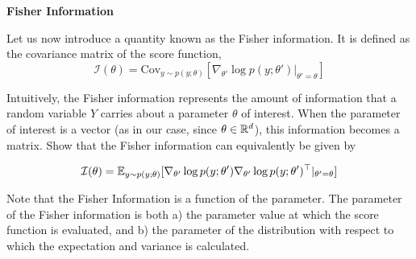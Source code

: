 \item {} \textbf{Fisher Information}

Let us now introduce a quantity known as the Fisher information. It is defined as the covariance matrix of the score function,
$$\mathcal{I}(\theta) = \text{Cov}_{y \sim p(y;\theta)}[\nabla_{\theta'}\log p(y;\theta')|_{\theta'=\theta}]$$

Intuitively, the Fisher information represents the amount of information that a random variable $Y$ carries about a parameter $\theta$ of interest. When the parameter of interest is a vector (as in our case, since $\theta \in \mathbb{R}^{{d}}$), this information becomes a matrix. Show that the Fisher information can equivalently be given by

$$\mathcal{I}(\theta)=\mathbb{E}_{y\sim p(y;\theta)}[\nabla_{\theta'} \log p(y;\theta')\nabla_{\theta'} \log p(y;\theta')^\top|_{\theta'=\theta}]$$

Note that the Fisher Information is a function of the parameter. The parameter of the Fisher information is both a) the parameter value at which the score function is evaluated, and b) the parameter of the distribution with respect to which the expectation and variance is calculated.

